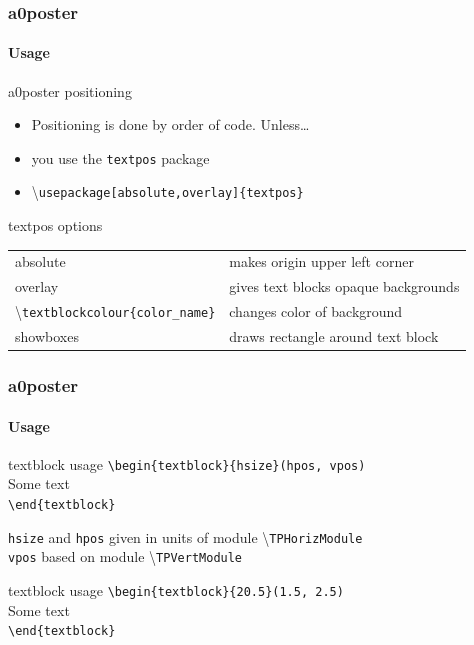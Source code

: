 \documentclass[11pt]{beamer}
\begin{document}
\begin{frame}
\frametitle{a0poster}\framesubtitle{Usage}
		\begin{block}{a0poster positioning}
			\begin{itemize}
				\item Positioning is done by order of code. Unless\ldots
				\item you use the \verb|textpos| package
				\item \textbackslash \verb|usepackage[absolute,overlay]{textpos}|
		\end{itemize}
					
		\end{block}		
		\footnotesize
		\begin{block}{textpos options}
				\begin{tabular}{ l l }
					absolute & makes origin upper left corner\\
					overlay & gives text blocks opaque backgrounds\\
					\textbackslash \verb|textblockcolour{color_name}| & changes color of background\\
					showboxes & draws rectangle around text block\\
				\end{tabular}	
		\end{block}
		
\end{frame}


\begin{frame}
\frametitle{a0poster}\framesubtitle{Usage}
		\begin{block}{textblock usage}
				\texttt{\textbackslash begin\{textblock\}\{hsize\}(hpos, vpos) }\\
					Some text\\
				\texttt{\textbackslash end\{textblock\}}\\
		\end{block}		
	\verb|hsize| and \verb|hpos| given in units of module \textbackslash \verb|TPHorizModule| \\
	\verb|vpos| based on module \textbackslash \verb|TPVertModule|
			\begin{block}{textblock usage}
				\texttt{\textbackslash begin\{textblock\}\{20.5\}(1.5, 2.5)}\\
					Some text\\
				\texttt{\textbackslash end\{textblock\}}\\
		\end{block}	
		
\end{frame}
\end{document}
